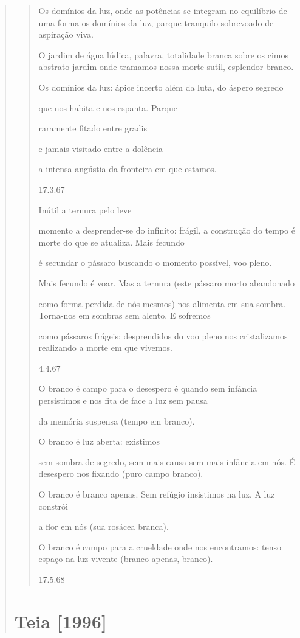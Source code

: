 \begin{verse}
\begin{quote}
Os domínios da luz, onde as potências se integram no equilíbrio de uma
forma os domínios da luz, parque tranquilo sobrevoado de aspiração viva.

O jardim de água lúdica, palavra, totalidade branca sobre os cimos
abstrato jardim onde tramamos nossa morte sutil, esplendor branco.

Os domínios da luz: ápice incerto além da luta, do áspero segredo

que nos habita e nos espanta. Parque

raramente fitado entre gradis

e jamais visitado entre a dolência

a intensa angústia da fronteira em que estamos.

17.3.67

Inútil a ternura pelo leve

momento a desprender-se do infinito: frágil, a construção do tempo é
morte do que se atualiza. Mais fecundo

é secundar o pássaro buscando o momento possível, voo pleno.

Mais fecundo é voar. Mas a ternura (este pássaro morto abandonado

como forma perdida de nós mesmos) nos alimenta em sua sombra. Torna-nos
em sombras sem alento. E sofremos

como pássaros frágeis: desprendidos do voo pleno nos cristalizamos
realizando a morte em que vivemos.

4.4.67

O branco é campo para o desespero é quando sem infância persistimos e
nos fita de face a luz sem pausa

da memória suspensa (tempo em branco).

O branco é luz aberta: existimos

sem sombra de segredo, sem mais causa sem mais infância em nós. É
desespero nos fixando (puro campo branco).

O branco é branco apenas. Sem refúgio insistimos na luz. A luz constrói

a flor em nós (sua rosácea branca).

O branco é campo para a crueldade onde nos encontramos: tenso espaço na
luz vivente (branco apenas, branco).

17.5.68
\end{quote}

\section{Teia {[}1996{]}}\label{teia}


\end{verse}
